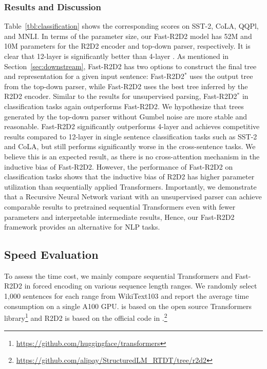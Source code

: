 \subsubsection{Results and Discussion}
Table~\ref{tbl:classification} shows the corresponding scores on SST-2, CoLA, QQPl, and MNLI. 
In terms of the parameter size, our Fast-R2D2 model has 52M and 10M parameters for the R2D2 encoder and top-down parser, respectively.
It is clear that 12-layer \bert is significantly better than 4-layer \bert.
As mentioned in Section~\ref{sec:downstream}, Fast-R2D2 has two options to construct the final tree and representation for a given input sentence:
Fast-R2D2$^*$ uses the output tree from the top-down parser, while Fast-R2D2 uses the best tree inferred by the R2D2 encoder.
Similar to the results for unsupervised parsing, Fast-R2D2$^*$ in classification tasks again outperforms Fast-R2D2.
We hypothesize that trees generated by the top-down parser without Gumbel noise are more stable and reasonable.
Fast-R2D2 significantly outperforms 4-layer \bert and achieves competitive results compared to 12-layer \bert in single sentence classification tasks such as SST-2 and CoLA, but still performs significantly worse in the cross-sentence tasks. 
We believe this is an expected result, as there is no cross-attention mechanism in the inductive bias of Fast-R2D2. 
However, the performance of Fast-R2D2 on classification tasks shows that the inductive bias of R2D2 has higher parameter utilization than sequentially applied Transformers.
Importantly, we demonstrate that a Recursive Neural Network variant with an unsupervised parser can achieve comparable results to pretrained sequential Transformers even with fewer parameters and interpretable intermediate results, 
Hence, our Fast-R2D2 framework provides an alternative for NLP tasks.

\subsection{Speed Evaluation}
To assess the time cost, we mainly compare sequential Transformers and Fast-R2D2 in forced encoding on various sequence length ranges. We randomly select 1,000 sentences for each range from WikiText103 and report the average time consumption on a single A100 GPU. \bert is based on the open source Transformers library\footnote{\url{https://github.com/huggingface/transformers}} and R2D2 is based on the official code in .\footnote{\url{https://github.com/alipay/StructuredLM_RTDT/tree/r2d2}}

